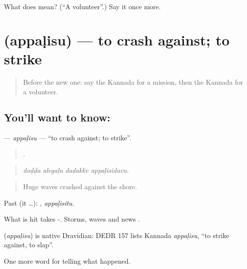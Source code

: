 \begin{tcolorbox}[breakable,colback=teal!4,colframe=teal!35!black,title={Before you move on}]
What does  mean? (\textquotedblleft{}A volunteer\textquotedblright{}.) Say it once more.
\end{tcolorbox}
\section[\texorpdfstring{\kn{ಅಪ್ಪಳಿಸು} (appaḷisu)}{ಅಪ್ಪಳಿಸು (appaḷisu)}]{ (appaḷisu) — to crash against; to strike}

\label{lesson:KA-C351-appalisu}



\begin{quote}
Before the new one: say the Kannada for a mission, then the Kannada for a volunteer.
\end{quote}

\subsection*{You'll want to know: }
\textbf{} — \emph{appaḷisu} — \textquotedblleft{}to crash against; to strike\textquotedblright{}.

\begin{quote}
   .
\end{quote}

\begin{quote}
\emph{doḍḍa alegaḷu daḍakke appaḷisidavu.}
\end{quote}

\begin{quote}
Huge waves crashed against the shore.
\end{quote}

Past (it …): , \emph{appaḷisitu}.

What is hit takes -. Storms, waves and news .

\begin{cousinweb}
\textbf{} (\emph{appaḷisu}) is native Dravidian: DEDR 157 lists Kannada \emph{appaḷisu}, \textquotedblleft{}to strike against, to slap\textquotedblright{}.
\end{cousinweb}

\begin{grammarlens}[title={What you've built}]
One more word for telling what happened.
\end{grammarlens}


